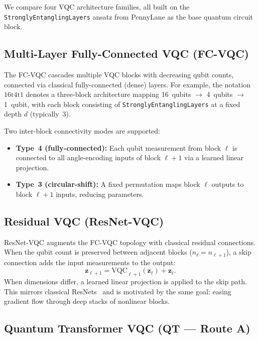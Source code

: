 
We compare four VQC architecture families, all built on the
\texttt{StronglyEntanglingLayers} ansatz from PennyLane as the base
quantum circuit block.

\subsection{Multi-Layer Fully-Connected VQC (FC-VQC)}

The FC-VQC cascades multiple VQC blocks with decreasing qubit counts,
connected via classical fully-connected (dense) layers.  For example,
the notation $16\mathrm{t}4\mathrm{t}1$ denotes a three-block architecture
mapping 16~qubits $\to$ 4~qubits $\to$ 1~qubit, with each block consisting
of \texttt{StronglyEntanglingLayers} at a fixed depth $d$ (typically~3).

Two inter-block connectivity modes are supported:
\begin{itemize}
  \item \textbf{Type~4 (fully-connected):} Each qubit measurement from
    block $\ell$ is connected to all angle-encoding inputs of block
    $\ell{+}1$ via a learned linear projection.
  \item \textbf{Type~3 (circular-shift):} A fixed permutation maps
    block $\ell$ outputs to block $\ell{+}1$ inputs, reducing parameters.
\end{itemize}

\subsection{Residual VQC (ResNet-VQC)}

ResNet-VQC augments the FC-VQC topology with classical residual connections.
When the qubit count is preserved between adjacent blocks ($n_\ell = n_{\ell+1}$),
a skip connection adds the input measurements to the output:
\begin{equation}
  \mathbf{z}_{\ell+1} = \mathrm{VQC}_{\ell+1}(\mathbf{z}_\ell) + \mathbf{z}_\ell.
\end{equation}
When dimensions differ, a learned linear projection is applied to the skip
path.  This mirrors classical ResNets~\cite{he2016deep} and is motivated by
the same goal: easing gradient flow through deep stacks of nonlinear blocks.

\subsection{Quantum Transformer VQC (QT --- Route A)}

